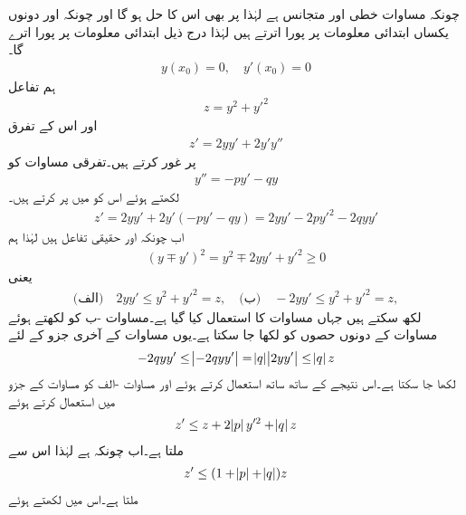چونکہ مساوات  خطی اور متجانس ہے  لہٰذا  پر  بھی اس کا حل ہو گا اور چونکہ  اور  دونوں یکساں ابتدائی معلومات پر پورا اترتے ہیں لہٰذا   درج ذیل ابتدائی معلومات پر پورا اترے گا۔
\begin{align}\label{مساوات_ضمیمہ_ضمنی_ابتدائی}
y(x_0)=0, \quad y'(x_0)=0
\end{align}
ہم تفاعل
\begin{align}\label{مساوات_ضمیمہ_ضمنی_تفاعل}
z=y^2+y'^2
\end{align}
اور اس کے تفرق
\begin{align}
z'=2yy'+2y'y''
\end{align}
پر غور کرتے ہیں۔تفرقی مساوات  کو
\begin{align*}
y''=-py'-qy
\end{align*}
لکھتے ہوئے اس کو  میں پر کرتے ہیں۔
\begin{align}\label{مساوات_ضمیمہ_ضمنی_تفاعل_ب}
z'=2yy'+2y'(-py'-qy)=2yy'-2py'^2-2qyy'
\end{align}
اب چونکہ  اور  حقیقی تفاعل ہیں لہٰذا ہم 
\begin{align}
(y \mp y')^2=y^2\mp 2yy'+y'^2 \ge 0
\end{align}
یعنی
\begin{align}\label{مساوات_ضمیمہ_ضمنی_حدود_الف}
\text{(الف)}\quad 2yy' \le y^2+y'^2=z, \quad \text{(ب)}\quad -2yy' \le y^2+y'^2=z,
\end{align}
لکھ سکتے ہیں جہاں مساوات  کا استعمال کیا گیا ہے۔مساوات -ب کو  لکھتے ہوئے مساوات  کے دونوں حصوں کو  لکھا جا سکتا ہے۔یوں مساوات  کے آخری جزو کے لئے
\begin{align*}
-2qyy'\le \abs{-2qyy'}=\abs{q}\abs{2yy'} \le \abs{q}z
\end{align*}
لکھا جا سکتا ہے۔اس نتیجے کے ساتھ ساتھ  استعمال کرتے ہوئے اور  مساوات -الف  کو  مساوات  کے  جزو میں استعمال کرتے ہوئے 
\begin{align*}
z' \le z+2\abs{p}y'^2+\abs{q}z
\end{align*}
ملتا ہے۔اب چونکہ  ہے لہٰذا اس سے
\begin{align*}
z' \le (1+\abs{p}+\abs{q})z
\end{align*}
ملتا ہے۔اس میں  لکھتے ہوئے
